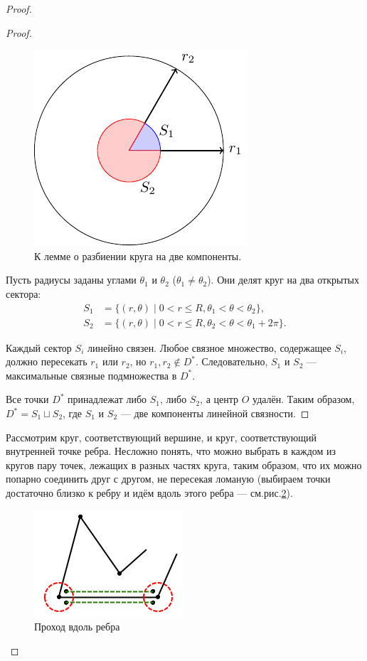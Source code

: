 \begin{proof}
\begin{proof}
        \begin{figure}[h]
            \centering
            \includegraphics[scale=1]{images/c4.7.pdf}
            \caption{К лемме о разбиении круга на две компоненты.}
            \label{fig:c4.7}
        \end{figure}

        Пусть радиусы заданы углами $\theta_1$ и $\theta_2$ ($\theta_1 \neq \theta_2$). Они делят круг на два открытых сектора:
        \begin{align*}
            S_1 &= \{ (r,\theta) \mid 0 < r \leq R, \theta_1 < \theta < \theta_2 \}, \\
            S_2 &= \{ (r,\theta) \mid 0 < r \leq R, \theta_2 < \theta < \theta_1 + 2\pi \}.
        \end{align*}

        Каждый сектор $S_i$ линейно связен.
        Любое связное множество, содержащее $S_i$, должно пересекать $r_1$ или $r_2$, но $r_1, r_2 \notin D^*$. Следовательно, $S_1$ и $S_2$ — максимальные связные подмножества в $D^*$.

        Все точки $D^*$ принадлежат либо $S_1$, либо $S_2$, а центр $O$ удалён. Таким образом, $D^* = S_1 \sqcup S_2$, где $S_1$ и $S_2$ — две компоненты линейной связности.
    \end{proof}

    Рассмотрим круг, соответствующий вершине, и круг, соответствующий внутренней точке ребра. Несложно понять, что можно выбрать в каждом из кругов пару точек, лежащих в разных частях круга, таким образом, что их можно попарно соединить друг с другом, не пересекая ломаную (выбираем точки достаточно близко к ребру и идём вдоль этого ребра — см.рис.\ref{fig:c4.2}).

    \begin{figure}[h]
        \centering
        \includegraphics{images/c4.2.png}
        \caption{Проход вдоль ребра}
        \label{fig:c4.2}
    \end{figure}


\end{proof}
